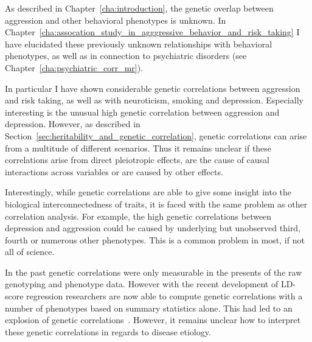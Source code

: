 As described in Chapter~\ref{cha:introduction}, the genetic overlap between aggression and other behavioral phenotypes is unknown.
In Chapter~\ref{cha:assocation_study_in_agggressive_behavior_and_risk_taking} I have elucidated these previously unknown relationships with behavioral phenotypes, as well as in connection to psychiatric disorders (see Chapter~\ref{cha:psychiatric_corr_mr}).

In particular I have shown considerable genetic correlations between aggression and risk taking, as well as with neuroticism, smoking and depression. 
Especially interesting is the unusual high genetic correlation between aggression and depression.
However, as described in Section~\ref{sec:heritability_and_genetic_correlation}, genetic correlations can arise from a multitude of different scenarios.
Thus it remains unclear if these correlations arise from direct pleiotropic effects, are the cause of causal interactions across variables or are caused by other effects. 

Interestingly, while genetic correlations are able to give some insight into the biological interconnectedness of traits, it is faced with the same problem as other correlation analysis. 
For example, the high genetic correlations between depression and aggression could be caused by underlying but unobserved third, fourth or numerous other phenotypes.
This is a common problem in most, if not all of science.

In the past genetic correlations were only measurable in the presents of the raw genotyping and phenotype data.
However with the recent development of LD-score regression researchers are now able to compute genetic correlations with a number of phenotypes based on summary statistics alone.
This had led to an explosion of genetic correlations~\cite{Bulik-Sullivan2015b,Bulik-Sullivan2015a}.
However, it remains unclear how to interpret these genetic correlations in regards to disease etiology.

